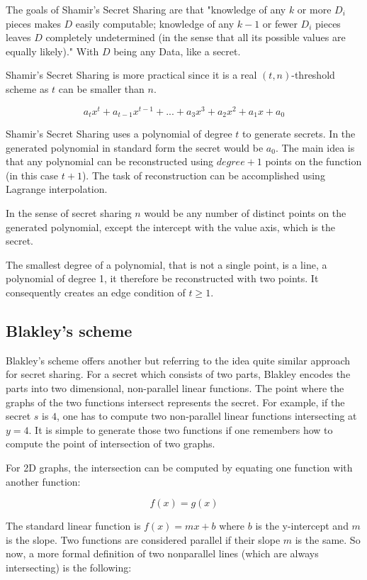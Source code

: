 The goals of Shamir's Secret Sharing are that "knowledge of any $k$ or more
$D_i$ pieces makes $D$ easily computable; knowledge of any $k - 1$ or fewer
$D_i$ pieces leaves $D$ completely undetermined (in the sense that all its
possible values are equally likely)." With $D$ being any Data, like a secret.

Shamir's Secret Sharing is more practical since it is a real $(t, n)$-threshold
scheme as $t$ can be smaller than $n$.

$$a_{t}x^t + a_{t-1}x^{t-1} + ... + a_{3}x^3 + a_{2}x^2 + a_{1}x + a_0 $$

Shamir's Secret Sharing uses a polynomial of degree $t$ to generate secrets.
In the generated polynomial in standard form the secret would be $a_0$. The
main idea is that any polynomial can be reconstructed using $degree + 1$ points
on the function (in this case $t + 1$). The task of reconstruction can be accomplished using Lagrange
interpolation.

In the sense of secret sharing $n$ would be any number of distinct points on
the generated polynomial, except the intercept with the value axis, which is
the secret.

The smallest degree of a polynomial, that is not a single point, is a line, a
polynomial of degree 1, it therefore be reconstructed with two points. It
consequently creates an edge condition of $t \geq 1$.

\subsection{Blakley's scheme}

Blakley's scheme offers another but referring to the idea quite similar
approach for secret sharing. For a secret which consists of two parts, 
Blakley encodes the parts into two dimensional, non-parallel linear functions.
The point where the graphs of the two functions intersect represents the
secret. For example, if the secret $s$ is $4$, one has to compute two non-parallel
linear functions intersecting at $y = 4$. It is simple to generate those two
functions if one remembers how to compute the point of intersection of two graphs.

For 2D graphs, the intersection can be computed by equating one function with
another function:

$$f(x) = g(x)$$

The standard linear function is $f(x) = mx + b$ where $b$ is the y-intercept and
$m$ is the slope. Two functions are considered parallel if their slope $m$ is 
the same. So now, a more formal definition of two nonparallel lines (which are
always intersecting) is the following:

